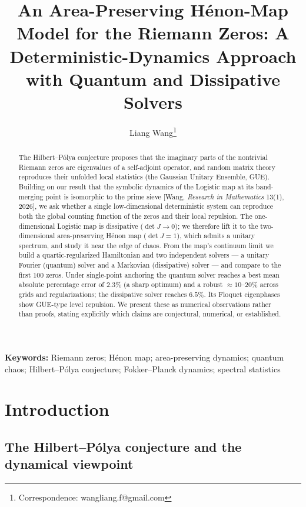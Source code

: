 \documentclass[11pt]{article}
\title{\bfseries An Area-Preserving H\'enon-Map Model for the Riemann Zeros:
A Deterministic-Dynamics Approach with Quantum and Dissipative Solvers}
\author[1]{Liang Wang\thanks{Correspondence: wangliang.f@gmail.com}}
\affil[1]{School of Artificial Intelligence and Automation, Huazhong University of Science and Technology, Wuhan, P.R. China}
\date{}
\begin{document}
\maketitle

\begin{abstract}
\noindent
The Hilbert--P\'olya conjecture proposes that the imaginary parts of the nontrivial Riemann zeros are eigenvalues of a self-adjoint operator, and random matrix theory reproduces their unfolded local statistics (the Gaussian Unitary Ensemble, GUE). Building on our result that the symbolic dynamics of the Logistic map at its band-merging point is isomorphic to the prime sieve [Wang, \emph{Research in Mathematics} 13(1), 2026], we ask whether a single low-dimensional deterministic system can reproduce both the global counting function of the zeros and their local repulsion. The one-dimensional Logistic map is dissipative ($\det J\to0$); we therefore lift it to the two-dimensional area-preserving H\'enon map ($\det J=1$), which admits a unitary spectrum, and study it near the edge of chaos. From the map's continuum limit we build a quartic-regularized Hamiltonian and two independent solvers --- a unitary Fourier (quantum) solver and a Markovian (dissipative) solver --- and compare to the first 100 zeros. Under single-point anchoring the quantum solver reaches a best mean absolute percentage error of $2.3\%$ (a sharp optimum) and a robust $\approx10$--$20\%$ across grids and regularizations; the dissipative solver reaches $6.5\%$. Its Floquet eigenphases show GUE-type level repulsion. We present these as numerical observations rather than proofs, stating explicitly which claims are conjectural, numerical, or established.
\end{abstract}

\noindent\textbf{Keywords:} Riemann zeros; H\'enon map; area-preserving dynamics; quantum chaos; Hilbert--P\'olya conjecture; Fokker--Planck dynamics; spectral statistics

\section{Introduction}

\subsection{The Hilbert--P\'olya conjecture and the dynamical viewpoint}
\end{document}
